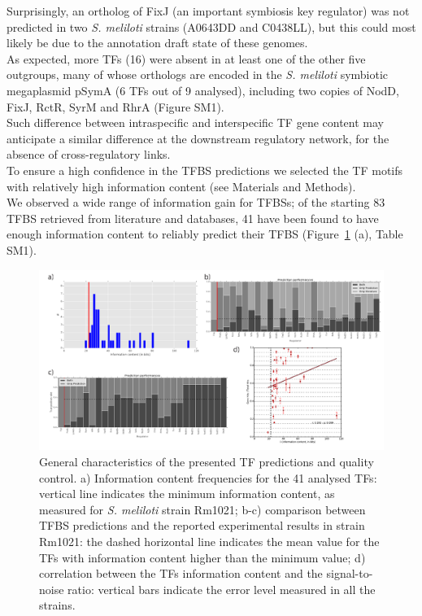  Surprisingly, an ortholog of FixJ (an important symbiosis key regulator) was not predicted in two \textit{S. meliloti} strains (A0643DD and C0438LL), but this could most likely be due to the annotation draft state of these genomes.\\
As expected, more TFs (16) were absent in at least one of the other five outgroups, many of whose orthologs are encoded in the \textit{S. meliloti} symbiotic megaplasmid pSymA (6 TFs out of 9 analysed), including two copies of NodD, FixJ, RctR, SyrM and RhrA (Figure SM1).\\
 Such difference between intraspecific and interspecific TF gene content may anticipate a similar difference at the downstream regulatory network, for the absence of cross-regulatory links.\\
To ensure a high confidence in the TFBS predictions we selected the TF motifs with relatively high information content (see Materials and Methods).\\
We observed a wide range of information gain for TFBSs; of the starting 83 TFBS retrieved from literature and databases, 41 have been found to have enough information content to reliably predict their TFBS (Figure~\ref{fig:reg1} (a), Table SM1).\\%
\begin{figure}[!tb]
	\centering
	\includegraphics[width=1\textwidth]{./figures/Appendix_1/1_reg}
  	\caption{\label{fig:reg1} General characteristics of the presented TF predictions and quality control. a) Information content frequencies for the 41 analysed TFs: vertical line indicates the minimum information content, as measured for \textit{S. meliloti} strain Rm1021; b-c) comparison between TFBS predictions and the reported experimental results in strain Rm1021: the dashed horizontal line indicates the mean value for the TFs with information content higher than the minimum value; d) correlation between the TFs information content and the signal-to-noise ratio: vertical bars indicate the error level measured in all the strains.}
\end{figure}%
